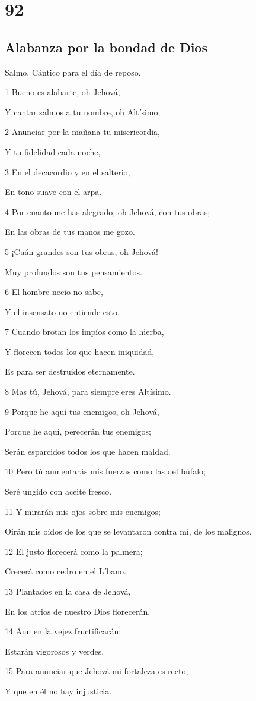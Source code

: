 \chapter{92}

\section*{Alabanza por la bondad de Dios}

\par Salmo. Cántico para el día de reposo.

\par 1 Bueno es alabarte, oh Jehová,
\par Y cantar salmos a tu nombre, oh Altísimo;
\par 2 Anunciar por la mañana tu misericordia,
\par Y tu fidelidad cada noche,
\par 3 En el decacordio y en el salterio,
\par En tono suave con el arpa.
\par 4 Por cuanto me has alegrado, oh Jehová, con tus obras;
\par En las obras de tus manos me gozo.
\par 5 ¡Cuán grandes son tus obras, oh Jehová!
\par Muy profundos son tus pensamientos.
\par 6 El hombre necio no sabe,
\par Y el insensato no entiende esto.
\par 7 Cuando brotan los impíos como la hierba,
\par Y florecen todos los que hacen iniquidad,
\par Es para ser destruidos eternamente.
\par 8 Mas tú, Jehová, para siempre eres Altísimo.
\par 9 Porque he aquí tus enemigos, oh Jehová,
\par Porque he aquí, perecerán tus enemigos;
\par Serán esparcidos todos los que hacen maldad.
\par 10 Pero tú aumentarás mis fuerzas como las del búfalo;
\par Seré ungido con aceite fresco.
\par 11 Y mirarán mis ojos sobre mis enemigos;
\par Oirán mis oídos de los que se levantaron contra mí, de los malignos.
\par 12 El justo florecerá como la palmera;
\par Crecerá como cedro en el Líbano.
\par 13 Plantados en la casa de Jehová,
\par En los atrios de nuestro Dios florecerán.
\par 14 Aun en la vejez fructificarán;
\par Estarán vigorosos y verdes,
\par 15 Para anunciar que Jehová mi fortaleza es recto,
\par Y que en él no hay injusticia.

